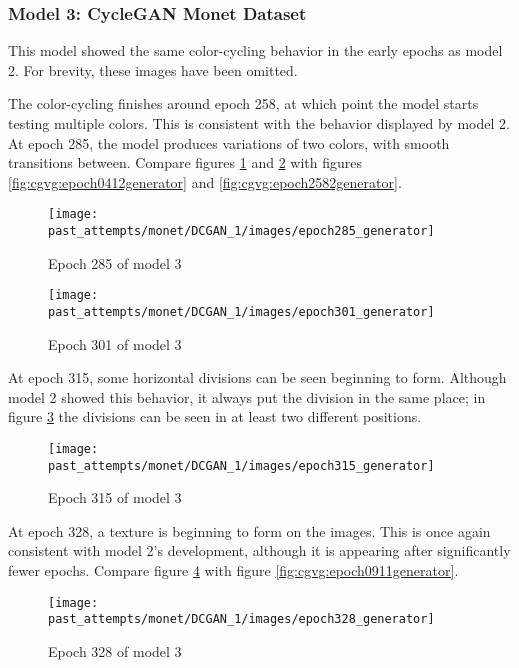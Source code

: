 \documentclass[11pt,letterpaper]{article}
\begin{document}
			\subsubsection{Model 3: CycleGAN Monet Dataset}
				This model showed the same color-cycling behavior in the early epochs as model 2.
				For brevity, these images have been omitted.

				The color-cycling finishes around epoch 258, at which point the model starts testing multiple colors.
				This is consistent with the behavior displayed by model 2.
				At epoch 285, the model produces variations of two colors, with smooth transitions between.
				Compare figures \ref{fig:cgm:epoch285generator} and \ref{fig:cgm:epoch301generator} with figures \ref{fig:cgvg:epoch0412generator} and \ref{fig:cgvg:epoch2582generator}.
				\begin{figure}
					\centering
					\texttt{[image: past\_attempts/monet/DCGAN\_1/images/epoch285\_generator]}
					\caption{Epoch 285 of model 3}
					\label{fig:cgm:epoch285generator}
				\end{figure}
				\begin{figure}
					\centering
					\texttt{[image: past\_attempts/monet/DCGAN\_1/images/epoch301\_generator]}
					\caption{Epoch 301 of model 3}
					\label{fig:cgm:epoch301generator}
				\end{figure}

				At epoch 315, some horizontal divisions can be seen beginning to form.
				Although model 2 showed this behavior, it always put the division in the same place; in figure \ref{fig:cgm:epoch315generator} the divisions can be seen in at least two different positions.
				\begin{figure}
					\centering
					\texttt{[image: past\_attempts/monet/DCGAN\_1/images/epoch315\_generator]}
					\caption[]{Epoch 315 of model 3}
					\label{fig:cgm:epoch315generator}
				\end{figure}

				At epoch 328, a texture is beginning to form on the images.
				This is once again consistent with model 2's development, although it is appearing after significantly fewer epochs.
				Compare figure \ref{fig:cgm:epoch328generator} with figure \ref{fig:cgvg:epoch0911generator}.
				\begin{figure}
					\centering
					\texttt{[image: past\_attempts/monet/DCGAN\_1/images/epoch328\_generator]}
					\caption[]{Epoch 328 of model 3}
					\label{fig:cgm:epoch328generator}
				\end{figure}
\end{document}

